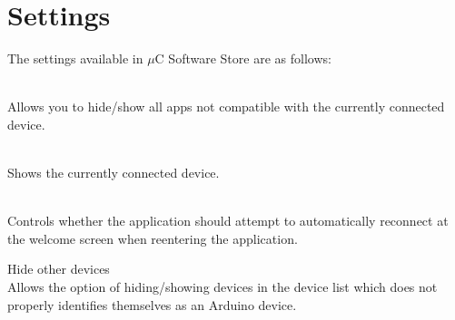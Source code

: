 	\section{Settings}
	The settings available in $\mu$C Software Store are as follows:

	\begin{description}
		\item[Hide/Show incompatible] \hfill \\
			Allows you to hide/show all apps not compatible with the currently connected device.
		\item[Connected device] \hfill \\
			Shows the currently connected device. 
		\item[Automatically reconnect] \hfill \\
			 Controls whether the application should attempt to automatically reconnect at the welcome screen when reentering the application.
		\item{Hide other devices}\hfill \\
		Allows the option of hiding/showing devices in the device list which does not properly identifies themselves as an Arduino device. 
	\end{description}
